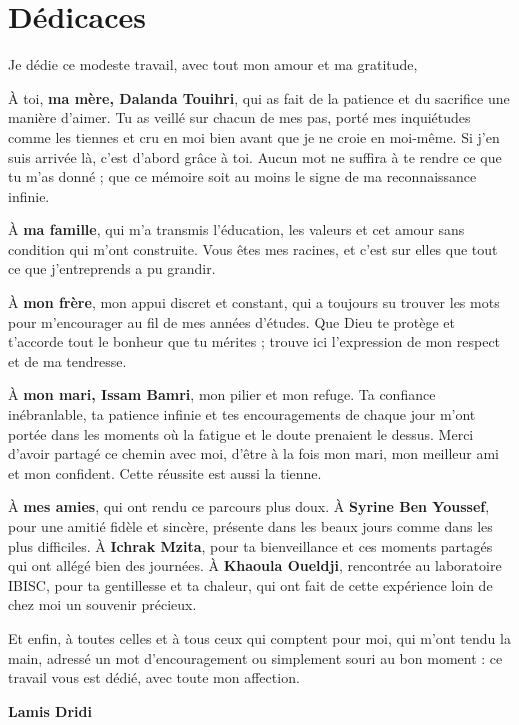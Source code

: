 \chapter*{Dédicaces}

\vspace*{-1.5cm}
{\itshape
\setlength{\parskip}{0.7em}
\setlength{\parindent}{0pt}

\begin{center}
Je dédie ce modeste travail, avec tout mon amour et ma gratitude,
\end{center}

À toi, \textbf{ma mère, Dalanda Touihri}, qui as fait de la patience et du sacrifice une manière d'aimer. Tu as veillé sur chacun de mes pas, porté mes inquiétudes comme les tiennes et cru en moi bien avant que je ne croie en moi-même. Si j'en suis arrivée là, c'est d'abord grâce à toi. Aucun mot ne suffira à te rendre ce que tu m'as donné ; que ce mémoire soit au moins le signe de ma reconnaissance infinie.

À \textbf{ma famille}, qui m'a transmis l'éducation, les valeurs et cet amour sans condition qui m'ont construite. Vous êtes mes racines, et c'est sur elles que tout ce que j'entreprends a pu grandir.

À \textbf{mon frère}, mon appui discret et constant, qui a toujours su trouver les mots pour m'encourager au fil de mes années d'études. Que Dieu te protège et t'accorde tout le bonheur que tu mérites ; trouve ici l'expression de mon respect et de ma tendresse.

À \textbf{mon mari, Issam Bamri}, mon pilier et mon refuge. Ta confiance inébranlable, ta patience infinie et tes encouragements de chaque jour m'ont portée dans les moments où la fatigue et le doute prenaient le dessus. Merci d'avoir partagé ce chemin avec moi, d'être à la fois mon mari, mon meilleur ami et mon confident. Cette réussite est aussi la tienne.

À \textbf{mes amies}, qui ont rendu ce parcours plus doux. À \textbf{Syrine Ben Youssef}, pour une amitié fidèle et sincère, présente dans les beaux jours comme dans les plus difficiles. À \textbf{Ichrak Mzita}, pour ta bienveillance et ces moments partagés qui ont allégé bien des journées. À \textbf{Khaoula Oueldji}, rencontrée au laboratoire IBISC, pour ta gentillesse et ta chaleur, qui ont fait de cette expérience loin de chez moi un souvenir précieux.

Et enfin, à toutes celles et à tous ceux qui comptent pour moi, qui m'ont tendu la main, adressé un mot d'encouragement ou simplement souri au bon moment : ce travail vous est dédié, avec toute mon affection.

}

\vspace{0.5em}
\begin{flushright}
{\large\textbf{Lamis Dridi}}
\end{flushright}
